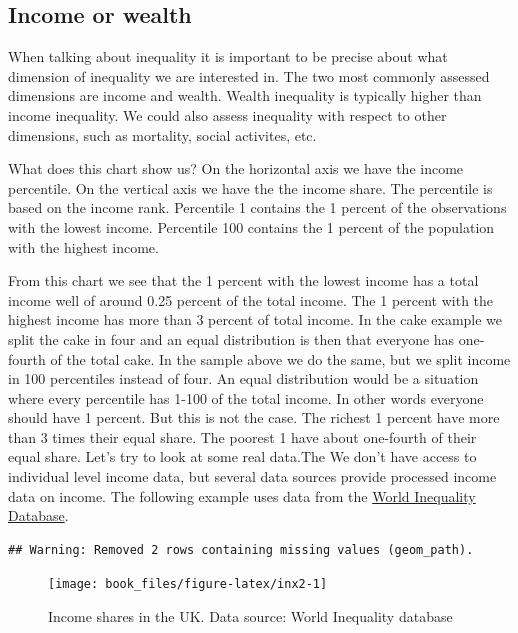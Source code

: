 \documentclass[]{book}
\begin{document}
\hypertarget{income-or-wealth}{%
\subsection{Income or wealth}\label{income-or-wealth}}

When talking about inequality it is important to be precise about what dimension of inequality we are interested in. The two most commonly assessed dimensions are income and wealth. Wealth inequality is typically higher than income inequality. We could also assess inequality with respect to other dimensions, such as mortality, social activites, etc.

What does this chart show us? On the horizontal axis we have the income percentile. On the vertical axis we have the the income share. The percentile is based on the income rank. Percentile 1 contains the 1 percent of the observations with the lowest income. Percentile 100 contains the 1 percent of the population with the highest income.

From this chart we see that the 1 percent with the lowest income has a total income well of around 0.25 percent of the total income. The 1 percent with the highest income has more than 3 percent of total income. In the cake example we split the cake in four and an equal distribution is then that everyone has one-fourth of the total cake. In the sample above we do the same, but we split income in 100 percentiles instead of four. An equal distribution would be a situation where every percentile has 1-100 of the total income. In other words everyone should have 1 percent. But this is not the case. The richest 1 percent have more than 3 times their equal share. The poorest 1 have about one-fourth of their equal share. Let's try to look at some real data.The We don't have access to individual level income data, but several data sources provide processed income data on income. The following example uses data from the \href{https://wid.world/data/}{World Inequality Database}.

\begin{verbatim}
## Warning: Removed 2 rows containing missing values (geom_path).
\end{verbatim}

\begin{figure}

{\centering \texttt{[image: book\_files/figure-latex/inx2-1]} 

}

\caption{\label{fig:figx1} Income shares in the UK. Data source: World Inequality database}\label{fig:inx2}
\end{figure}
\end{document}
